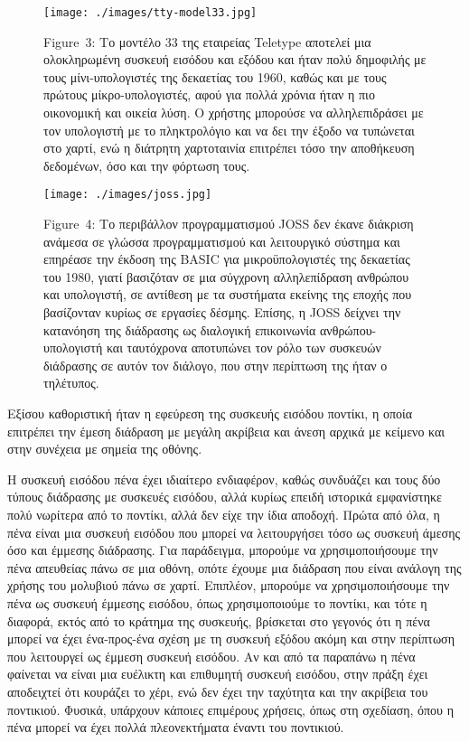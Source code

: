 \documentclass[
]{article}
\begin{document}
\leavevmode{}%
\begin{figure}
\hypertarget{fig:tty-model33}{%
\centering
\texttt{[image: ./images/tty-model33.jpg]}
\caption{Figure~3: Το μοντέλο 33 της εταιρείας Teletype αποτελεί μια
ολοκληρωμένη συσκευή εισόδου και εξόδου και ήταν πολύ δημοφιλής με τους
μίνι-υπολογιστές της δεκαετίας του 1960, καθώς και με τους πρώτους
μίκρο-υπολογιστές, αφού για πολλά χρόνια ήταν η πιο οικονομική και
οικεία λύση. Ο χρήστης μπορούσε να αλληλεπιδράσει με τον υπολογιστή με
το πληκτρολόγιο και να δει την έξοδο να τυπώνεται στο χαρτί, ενώ η
διάτρητη χαρτοταινία επιτρέπει τόσο την αποθήκευση δεδομένων, όσο και
την φόρτωση τους.}\label{fig:tty-model33}
}
\end{figure}

\leavevmode{}%
\begin{figure}
\hypertarget{fig:joss}{%
\centering
\texttt{[image: ./images/joss.jpg]}
\caption{Figure~4: Το περιβάλλον προγραμματισμού JOSS δεν έκανε διάκριση
ανάμεσα σε γλώσσα προγραμματισμού και λειτουργικό σύστημα και επηρέασε
την έκδοση της BASIC για μικροϋπολογιστές της δεκαετίας του 1980, γιατί
βασιζόταν σε μια σύγχρονη αλληλεπίδραση ανθρώπου και υπολογιστή, σε
αντίθεση με τα συστήματα εκείνης της εποχής που βασίζονταν κυρίως σε
εργασίες δέσμης. Επίσης, η JOSS δείχνει την κατανόηση της διάδρασης ως
διαλογική επικοινωνία ανθρώπου-υπολογιστή και ταυτόχρονα αποτυπώνει τον
ρόλο των συσκευών διάδρασης σε αυτόν τον διάλογο, που στην περίπτωση της
ήταν ο τηλέτυπος.}\label{fig:joss}
}
\end{figure}

Εξίσου καθοριστική ήταν η εφεύρεση της συσκευής εισόδου ποντίκι, η οποία
επιτρέπει την έμεση διάδραση με μεγάλη ακρίβεια και άνεση αρχικά με
κείμενο και στην συνέχεια με σημεία της οθόνης.

Η συσκευή εισόδου πένα έχει ιδιαίτερο ενδιαφέρον, καθώς συνδυάζει και
τους δύο τύπους διάδρασης με συσκευές εισόδου, αλλά κυρίως επειδή
ιστορικά εμφανίστηκε πολύ νωρίτερα από το ποντίκι, αλλά δεν είχε την
ίδια αποδοχή. Πρώτα από όλα, η πένα είναι μια συσκευή εισόδου που μπορεί
να λειτουργήσει τόσο ως συσκευή άμεσης όσο και έμμεσης διάδρασης. Για
παράδειγμα, μπορούμε να χρησιμοποιήσουμε την πένα απευθείας πάνω σε μια
οθόνη, οπότε έχουμε μια διάδραση που είναι ανάλογη της χρήσης του
μολυβιού πάνω σε χαρτί. Επιπλέον, μπορούμε να χρησιμοποιήσουμε την πένα
ως συσκευή έμμεσης εισόδου, όπως χρησιμοποιούμε το ποντίκι, και τότε η
διαφορά, εκτός από το κράτημα της συσκευής, βρίσκεται στο γεγονός ότι η
πένα μπορεί να έχει ένα-προς-ένα σχέση με τη συσκευή εξόδου ακόμη και
στην περίπτωση που λειτουργεί ως έμμεση συσκευή εισόδου. Αν και από τα
παραπάνω η πένα φαίνεται να είναι μια ευέλικτη και επιθυμητή συσκευή
εισόδου, στην πράξη έχει αποδειχτεί ότι κουράζει το χέρι, ενώ δεν έχει
την ταχύτητα και την ακρίβεια του ποντικιού. Φυσικά, υπάρχουν κάποιες
επιμέρους χρήσεις, όπως στη σχεδίαση, όπου η πένα μπορεί να έχει πολλά
πλεονεκτήματα έναντι του ποντικιού.
\end{document}

